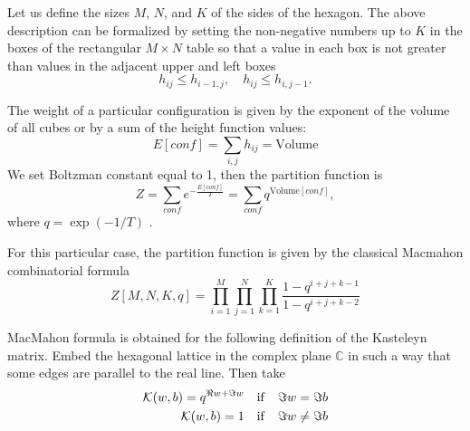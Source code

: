 \documentclass{article}
\newcommand{\gf}{\mathfrak{g}}
\begin{document}
Let us define the sizes $M$, $N$, and $K$ of the sides of the hexagon.
The above description can be formalized by
setting the non-negative numbers up to $K$ in the boxes of the rectangular $M\times N$ table so that a value in
each box is not greater than values in the adjacent upper and left boxes
\begin{equation}
  \label{eq:1}
  h_{ij}\leq h_{i-1,j},\quad h_{ij}\leq h_{i,j-1}.
\end{equation}

The weight of a particular configuration is given by the exponent of the volume of all cubes or by a
sum of the height function values:
\begin{equation*}
  \label{eq:10}
  E[conf]=\sum_{i,j} h_{ij}=\mathrm{Volume}
\end{equation*}
We set Boltzman constant equal to 1, then the partition function is 
\begin{equation*}
  \label{eq:14}
  Z=\sum_{conf} e^{-\frac{E[conf]}{T}}=\sum_{conf}q^{\mathrm{Volume}[conf]}, 
\end{equation*}
where $q=\exp\left(-1/T\right)$ .

For this particular case, the partition function is given by the classical Macmahon combinatorial
formula~\cite{vuletic2009generalization}
\begin{equation}
  \label{eq:12}
   Z[M,N,K,q]=\prod_{i=1}^{M}\prod_{j=1}^{N}\prod_{k=1}^{K}\frac{1-q^{i+j+k-1}}{1-q^{i+j+k-2}}
\end{equation}


MacMahon formula is obtained for the following definition of the Kasteleyn matrix. Embed the
hexagonal lattice in the complex plane $\mathbb{C}$ in such a way that some edges are parallel to
the real line. Then take
\begin{eqnarray}
  \label{eq:18}
  {\cal K}(w,b)=q^{\Re w+\Im w} \quad \mathrm{if}\quad \Im w=\Im b\\
  {\cal K}(w,b)=1 \quad \mathrm{if}\quad \Im w\neq\Im b
\end{eqnarray}


  
\end{document}
